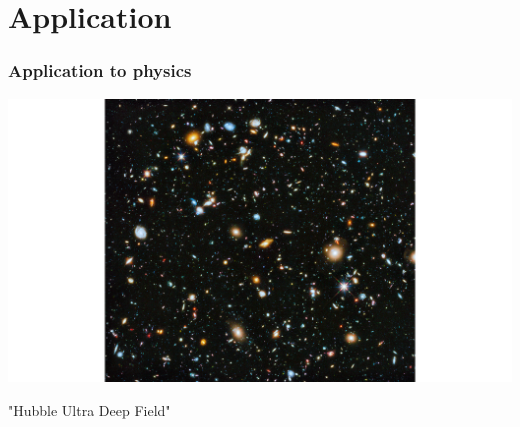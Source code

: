 \documentclass{beamer}
\begin{document}
	\section{Application}
	\begin{frame}
		\frametitle{Application to physics}
		
		\includegraphics[scale=0.25]{hubble1.jpg}
		
		"Hubble Ultra Deep Field"
	\end{frame}
	
\end{document}
